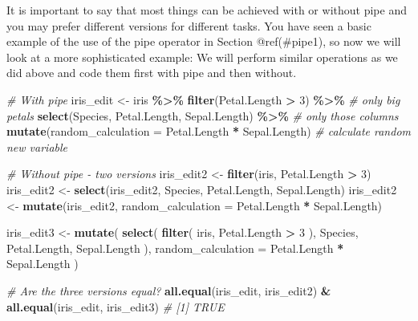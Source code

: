 \documentclass[
]{book}
\newenvironment{Shaded}{\begin{snugshade}}{\end{snugshade}}
\newcommand{\AttributeTok}[1]{\textcolor[rgb]{0.13,0.29,0.53}{#1}}
\newcommand{\CommentTok}[1]{\textcolor[rgb]{0.56,0.35,0.01}{\textit{#1}}}
\newcommand{\DecValTok}[1]{\textcolor[rgb]{0.00,0.00,0.81}{#1}}
\newcommand{\FunctionTok}[1]{\textcolor[rgb]{0.13,0.29,0.53}{\textbf{#1}}}
\newcommand{\NormalTok}[1]{#1}
\newcommand{\OtherTok}[1]{\textcolor[rgb]{0.56,0.35,0.01}{#1}}
\newcommand{\SpecialCharTok}[1]{\textcolor[rgb]{0.81,0.36,0.00}{\textbf{#1}}}
\begin{document}
It is important to say that most things can be achieved with or without pipe and you may prefer different versions for different tasks.
You have seen a basic example of the use of the pipe operator in Section @ref(\#pipe1), so now we will look at a more sophisticated example: We will perform similar operations as we did above and code them first with pipe and then without.

\begin{Shaded}
\begin{Highlighting}[]
\CommentTok{\# With pipe}
\NormalTok{iris\_edit }\OtherTok{\textless{}{-}}\NormalTok{ iris }\SpecialCharTok{\%\textgreater{}\%}
 \FunctionTok{filter}\NormalTok{(Petal.Length }\SpecialCharTok{\textgreater{}} \DecValTok{3}\NormalTok{) }\SpecialCharTok{\%\textgreater{}\%} \CommentTok{\# only big petals}
 \FunctionTok{select}\NormalTok{(Species, Petal.Length, Sepal.Length) }\SpecialCharTok{\%\textgreater{}\%}  \CommentTok{\# only those columns}
 \FunctionTok{mutate}\NormalTok{(}\AttributeTok{random\_calculation =}\NormalTok{ Petal.Length }\SpecialCharTok{*}\NormalTok{ Sepal.Length) }\CommentTok{\# calculate random new variable}

\CommentTok{\# Without pipe {-} two versions }
\NormalTok{iris\_edit2 }\OtherTok{\textless{}{-}} \FunctionTok{filter}\NormalTok{(iris, Petal.Length }\SpecialCharTok{\textgreater{}} \DecValTok{3}\NormalTok{)}
\NormalTok{iris\_edit2 }\OtherTok{\textless{}{-}} \FunctionTok{select}\NormalTok{(iris\_edit2, Species, Petal.Length, Sepal.Length)}
\NormalTok{iris\_edit2 }\OtherTok{\textless{}{-}} \FunctionTok{mutate}\NormalTok{(iris\_edit2, }\AttributeTok{random\_calculation =}\NormalTok{ Petal.Length }\SpecialCharTok{*}\NormalTok{ Sepal.Length)}

\NormalTok{iris\_edit3 }\OtherTok{\textless{}{-}} \FunctionTok{mutate}\NormalTok{(}
  \FunctionTok{select}\NormalTok{(}
    \FunctionTok{filter}\NormalTok{(}
\NormalTok{      iris, Petal.Length }\SpecialCharTok{\textgreater{}} \DecValTok{3}
\NormalTok{    ),}
\NormalTok{    Species, Petal.Length, Sepal.Length}
\NormalTok{  ), }
  \AttributeTok{random\_calculation =}\NormalTok{ Petal.Length }\SpecialCharTok{*}\NormalTok{ Sepal.Length}
\NormalTok{)}

\CommentTok{\# Are the three versions equal?}
\FunctionTok{all.equal}\NormalTok{(iris\_edit, iris\_edit2) }\SpecialCharTok{\&} \FunctionTok{all.equal}\NormalTok{(iris\_edit, iris\_edit3)}
\CommentTok{\# [1] TRUE}
\end{Highlighting}
\end{Shaded}
\end{document}
